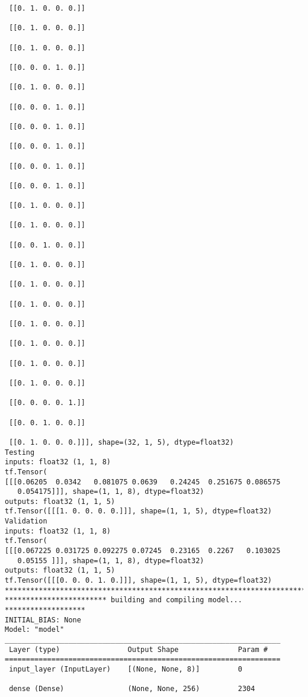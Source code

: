 \documentclass[
  letterpaper,
  DIV=11,
  numbers=noendperiod]{scrreprt}
\begin{document}
\begin{verbatim}
 [[0. 1. 0. 0. 0.]]

 [[0. 1. 0. 0. 0.]]

 [[0. 1. 0. 0. 0.]]

 [[0. 0. 0. 1. 0.]]

 [[0. 1. 0. 0. 0.]]

 [[0. 0. 0. 1. 0.]]

 [[0. 0. 0. 1. 0.]]

 [[0. 0. 0. 1. 0.]]

 [[0. 0. 0. 1. 0.]]

 [[0. 0. 0. 1. 0.]]

 [[0. 1. 0. 0. 0.]]

 [[0. 1. 0. 0. 0.]]

 [[0. 0. 1. 0. 0.]]

 [[0. 1. 0. 0. 0.]]

 [[0. 1. 0. 0. 0.]]

 [[0. 1. 0. 0. 0.]]

 [[0. 1. 0. 0. 0.]]

 [[0. 1. 0. 0. 0.]]

 [[0. 1. 0. 0. 0.]]

 [[0. 1. 0. 0. 0.]]

 [[0. 0. 0. 0. 1.]]

 [[0. 0. 1. 0. 0.]]

 [[0. 1. 0. 0. 0.]]], shape=(32, 1, 5), dtype=float32)
Testing
inputs: float32 (1, 1, 8)
tf.Tensor(
[[[0.06205  0.0342   0.081075 0.0639   0.24245  0.251675 0.086575
   0.054175]]], shape=(1, 1, 8), dtype=float32)
outputs: float32 (1, 1, 5)
tf.Tensor([[[1. 0. 0. 0. 0.]]], shape=(1, 1, 5), dtype=float32)
Validation
inputs: float32 (1, 1, 8)
tf.Tensor(
[[[0.067225 0.031725 0.092275 0.07245  0.23165  0.2267   0.103025
   0.05155 ]]], shape=(1, 1, 8), dtype=float32)
outputs: float32 (1, 1, 5)
tf.Tensor([[[0. 0. 0. 1. 0.]]], shape=(1, 1, 5), dtype=float32)
****************************************************************************
************************ building and compiling model... *******************
INITIAL_BIAS: None
Model: "model"
_________________________________________________________________
 Layer (type)                Output Shape              Param #   
=================================================================
 input_layer (InputLayer)    [(None, None, 8)]         0         
                                                                 
 dense (Dense)               (None, None, 256)         2304      
                                                                 

\end{verbatim}
\end{document}
